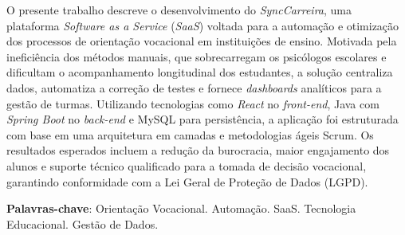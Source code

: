 \begin{resumo}
O presente trabalho descreve o desenvolvimento do \textit{SyncCarreira}, uma plataforma \textit{Software as a Service} (\textit{SaaS}) voltada para a automação e otimização dos processos de orientação vocacional em instituições de ensino. Motivada pela ineficiência dos métodos manuais, que sobrecarregam os psicólogos escolares e dificultam o acompanhamento longitudinal dos estudantes, a solução centraliza dados, automatiza a correção de testes e fornece \textit{dashboards} analíticos para a gestão de turmas. Utilizando tecnologias como \textit{React} no \textit{front-end}, Java com \textit{Spring Boot} no \textit{back-end} e MySQL para persistência, a aplicação foi estruturada com base em uma arquitetura em camadas e metodologias ágeis Scrum. Os resultados esperados incluem a redução da burocracia, maior engajamento dos alunos e suporte técnico qualificado para a tomada de decisão vocacional, garantindo conformidade com a Lei Geral de Proteção de Dados (LGPD).

\vspace{\onelineskip}
\noindent
\textbf{Palavras-chave}: Orientação Vocacional. Automação. SaaS. Tecnologia Educacional. Gestão de Dados.
\end{resumo}
